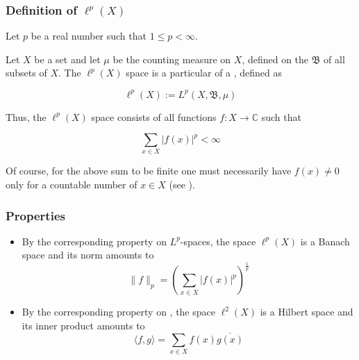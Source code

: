 \documentclass[12pt]{article}
\begin{document}

\subsubsection{Definition of $\ell^p(X)$}

Let $p$ be a real number such that $1 \leq p < \infty$.

Let $X$ be a set and let $\mu$ be the counting measure on $X$, defined on the  $\mathfrak{B}$ of all subsets of $X$. The $\ell^p(X)$ space is a particular  of a , defined as

\begin{displaymath}
\ell^p(X) := L^p(X, \mathfrak{B}, \mu)
\end{displaymath}

Thus, the $\ell^p(X)$ space consists of all functions $f:X \longrightarrow \mathbb{C}$ such that

\begin{displaymath}
\sum_{x \in X} |f(x)|^p < \infty
\end{displaymath}

Of course, for the above sum to be finite one must necessarily have $f(x) \neq 0$ only for a countable number of $x \in X$ (see ).

\subsubsection{Properties}
\begin{itemize}
\item By the corresponding property on $L^p$-spaces, the space $\ell^p(X)$ is a Banach space and its norm amounts to
\begin{displaymath}
\|f\|_p = \left ( \sum_{x \in X} |f(x)|^p \right )^{\frac{1}{p}}
\end{displaymath}
\end{itemize}
\begin{itemize}
\item By the corresponding property on , the space $\ell^2(X)$ is a Hilbert space and its inner product amounts to
\begin{displaymath}
\langle f, g\rangle = \sum_{x \in X} f(x)\overline{g(x)}
\end{displaymath}
\end{itemize}
\end{document}
